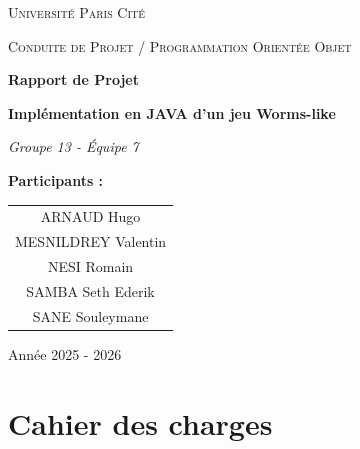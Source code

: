 \documentclass[a4paper, 12pt]{article}
\begin{document}
    \begin{titlepage}
        \centering
        {\scshape\LARGE Université Paris Cité \par}
        \vspace{1cm}
        {\scshape\Large Conduite de Projet / Programmation Orientée Objet \par}
        \vspace{1.5cm}
        {\huge\bfseries Rapport de Projet\par}
        \vspace{2cm}
        {\huge\bfseries Implémentation en JAVA d'un jeu Worms-like \par}
        \vspace{2cm}
        {\Large\itshape Groupe 13 - Équipe 7 \par}
        \vspace{1cm}
        \textbf{Participants :}\\
        \vspace{0.5cm}
        \begin{tabular}{c}
            ARNAUD Hugo \\
            MESNILDREY Valentin \\
            NESI Romain \\
            SAMBA Seth Ederik \\
            SANE Souleymane
        \end{tabular}
        \vfill
        {\large Année 2025 - 2026 \par}
    \end{titlepage}

    \setcounter{page}{2}
    \tableofcontents
    \newpage


    \section{Cahier des charges}
\end{document}
